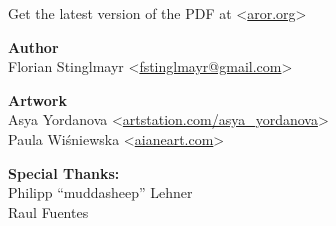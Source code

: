 \onecolumn


\vspace*{\fill}

\begin{center}
  Get the latest version of the PDF at <\href{https://aror.org}{aror.org}>

  \textbf{Author}\\
  Florian Stinglmayr
  <\href{mailto:fstinglmayr@gmail.com}{fstinglmayr@gmail.com}>

  \textbf{Artwork}\\
  Asya Yordanova
  <\href{https://artstation.com/asya\_yordanova}{artstation.com/asya\_yordanova}> \\
  Paula Wiśniewska
  <\href{http://aianeart.com}{aianeart.com}>

  \textbf{Special Thanks:}\\
  Philipp ``muddasheep'' Lehner\\
  Raul Fuentes
\end{center}

\twocolumn
\newpage
